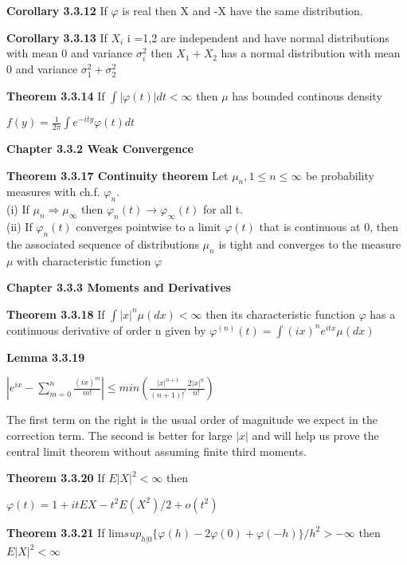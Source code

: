 \documentclass{article}
\begin{document}
\textbf {Corollary 3.3.12} If $\varphi$ is real then X and -X have the same distribution. 

\textbf {Corollary 3.3.13} If $X_i$ i =1,2 are independent and have normal distributions with mean 0 and variance $\sigma_i^2$ then $X_1 + X_2$ has a normal distribution with mean 0 and variance $\sigma_1^2 +\sigma_2^2$

\textbf {Theorem 3.3.14} If $\int |\varphi(t)|dt < \infty$ then $\mu$ has bounded continous density
\begin{center}
$f(y) = \frac{1}{2\pi} \int e^{-ity} \varphi(t) dt$
\end{center}

\textbf {Chapter 3.3.2 Weak Convergence}

\textbf {Theorem 3.3.17 Continuity theorem} Let $\mu_n, 1 \leq n \leq \infty$ be probability measures with ch.f. $\varphi_n$. \\
(i) If $\mu_n \Rightarrow \mu_\infty$ then $\varphi_n(t) \rightarrow \varphi_\infty(t)$ for all t. \\
(ii) If $\varphi_n(t)$ converges pointwise to a limit $\varphi(t)$ that is continuous at 0, then the associated sequence of distributions $\mu_n$ is tight and converges to the measure $\mu$ with characteristic function $\varphi$

\textbf {Chapter 3.3.3 Moments and Derivatives}

\textbf {Theorem 3.3.18} If $\int |x|^n \mu(dx) < \infty$ then its characteristic function $\varphi$ has a continuous derivative of order n given by $\varphi^{(n)}(t) = \int (ix)^n e^{itx} \mu (dx)$

\textbf {Lemma 3.3.19} 
\begin{center}
$|e^{ix} - \sum_{m=0}^n \frac{(ix)^m}{m!} | \leq min (\frac{|x|^{n+1}}{(n+1)!^{'}} \frac{2|x|^n}{n!} )$
\end{center}
The first term on the right is the usual order of magnitude we expect in the correction term. The second is better for large $|x|$ and will help us prove the central limit theorem without assuming finite third moments.

\textbf {Theorem 3.3.20} If $E|X|^2 < \infty$ then 
\begin{center}
$\varphi(t) = 1 + itEX - t^2 E(X^2) / 2 + o(t^2)$
\end{center}

\textbf {Theorem 3.3.21} If lim$sup_{h|0} \{ \varphi(h) - 2\varphi(0) + \varphi(-h)\} / h^2 > -\infty$ then $E|X|^2 < \infty$
\end{document}
